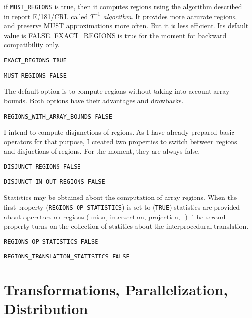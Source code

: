 if {\tt MUST\_REGIONS} is true, then it computes regions using the
algorithm described in report E/181/CRI, called {\em $T^{-1}$
algorithm}. It provides more accurate regions, and preserve MUST
approximations more often. But it is less efficient. Its default value
is FALSE. EXACT\_REGIONS is true for the moment for backward
compatibility only.

\begin{verbatim}
EXACT_REGIONS TRUE
\end{verbatim}

\begin{verbatim}
MUST_REGIONS FALSE
\end{verbatim}

The default option is to compute regions without taking into account array
bounds. Both options have their advantages and drawbacks. 

\begin{verbatim}
REGIONS_WITH_ARRAY_BOUNDS FALSE
\end{verbatim}

I intend to compute disjunctions of regions. As I have already prepared basic
operators for that purpose, I created two properties to switch between regions
and disjuctions of regions. For the moment, they are always false.

\begin{verbatim}
DISJUNCT_REGIONS FALSE
\end{verbatim}

\begin{verbatim}
DISJUNCT_IN_OUT_REGIONS FALSE
\end{verbatim}

Statistics may be obtained about the computation of array regions. When the first
property ({\tt REGIONS\_OP\_STATISTICS}) is set to ({\tt TRUE}) statistics are
provided about operators on regions (union, intersection,
projection,\dots). The second property turns on the collection of statitics
about the interprocedural translation.

\begin{verbatim}
REGIONS_OP_STATISTICS FALSE
\end{verbatim}

\begin{verbatim}
REGIONS_TRANSLATION_STATISTICS FALSE
\end{verbatim}




\section{Transformations, Parallelization, Distribution}
\label{section-transformations}


